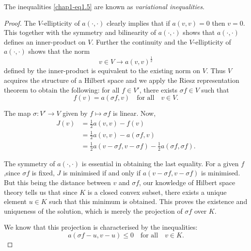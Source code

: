 \begin{remark}\label{chap1-rem1.1}
The inequalities \eqref{chap1-eq1.5} are known as {\em variational
  inequalities}. 
\end{remark}

\begin{proof}
The $V$-ellipticity of $a(\cdot,\cdot)$ clearly implies that if
$a(v,v)=0$ then $v=0$. This together with the symmetry and bilinearity
of $a(\cdot,\cdot)$ shows that $a(\cdot,\cdot)$ defines an
inner-product on $V$. Further the continuity and the $V$-ellipticity
of $a(\cdot,\cdot)$ shows that the norm
\begin{equation*}
v\in V\to a(v,v)^{\frac{1}{2}}\tag{1.6}\label{chap1-eq1.6}
\end{equation*}
defined by the inner-product is equivalent to the existing norm on
$V$. Thus $V$ acquires the structure of a Hilbert space and we apply
the Riesz representation theorem to obtain the following: for all
$f\in V'$, there exists $\sigma f\in V$ such that
\begin{equation*}
f(v)=a(\sigma f,v)\quad\text{for all}\quad v\in
V.\tag{1.7}\label{chap1-eq1.7} 
\end{equation*}

The map $\sigma:V'\to V$ given by $f\mapsto \sigma f$ is linear. Now,
\begin{align*}
J(v) &=\frac{1}{2}a(v,v)-f(v)\\
     &= \frac{1}{2}a(v,v)-a(\sigma f,v)\\
     &= \frac{1}{2}a(v-\sigma f, v-\sigma f)-\frac{1}{2}a(\sigma
f,\sigma f).
\end{align*}

The symmetry of $a(\cdot,\cdot)$ is essential in obtaining the last
equality. For a given $f$,\pageoriginale since $\sigma f$ is fixed,
$J$ is minimised if and only if $a(v-\sigma f,v-\sigma f)$ is
minimised. But this being the distance between $v$ and $\sigma f$, our
knowledge of Hilbert space theory tells us that since $K$ is a closed
convex subset, there exists a unique element $u\in K$ such that this
minimum is obtained. This proves the existence and uniqueness of the
solution, which is merely the projection of $\sigma f$ over $K$.

We know that this projection is characterised by the inequalities:
\begin{equation*}
a(\sigma f-u,v-u)\leq 0\quad \text{for all}\quad v\in
K.\tag{1.8}\label{chap1-eq1.8} 
\end{equation*}


\end{proof}
